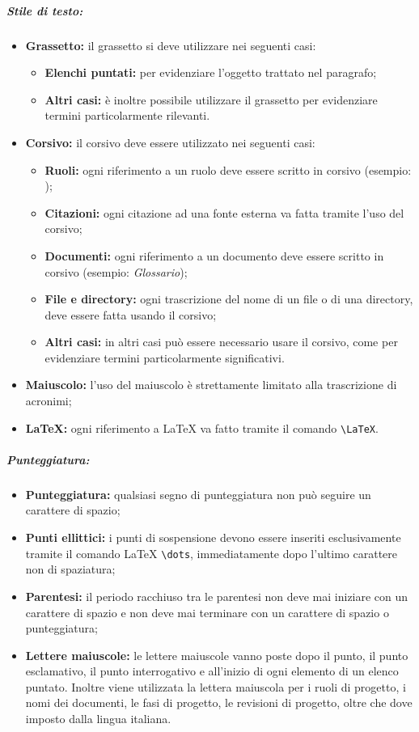 \subparagraph{Stile di testo:}
\label{stile}
\begin{itemize}
\item \textbf{Grassetto:} il grassetto si deve utilizzare nei seguenti casi:
\begin{itemize}
\item \textbf{Elenchi puntati:} per evidenziare l'oggetto trattato nel paragrafo;
\item \textbf{Altri casi:} è inoltre possibile utilizzare il grassetto per evidenziare termini particolarmente rilevanti. 
\end{itemize}
\item \textbf{Corsivo:} il corsivo deve essere utilizzato nei seguenti casi:
\begin{itemize}
\item \textbf{Ruoli:} ogni riferimento a un ruolo deve essere scritto in corsivo (esempio: \projectManager);
\item \textbf{Citazioni:} ogni citazione ad una fonte esterna va fatta tramite l'uso del corsivo;
\item \textbf{Documenti:} ogni riferimento a un documento deve essere scritto in corsivo (esempio: \emph{Glossario});
\item\textbf{File e directory:} ogni trascrizione del nome di un file o di una directory, deve essere fatta usando il corsivo; 
\item \textbf{Altri casi:} in altri casi può essere necessario usare il corsivo, come per evidenziare termini particolarmente significativi.
\end{itemize}
\item \textbf{Maiuscolo:} l'uso del maiuscolo è strettamente limitato alla trascrizione di acronimi;
\item \textbf{\LaTeX{}:} ogni riferimento a \LaTeX{} va fatto tramite il comando \verb!\LaTeX!.
\end{itemize}

\subparagraph{Punteggiatura:}
\label{punteggiatura}
\begin{itemize}
\item \textbf{Punteggiatura:} qualsiasi segno di punteggiatura non può seguire un carattere di spazio;
\item \textbf{Punti ellittici:} i punti di sospensione devono essere inseriti esclusivamente tramite il comando \LaTeX{} \verb!\dots!, immediatamente dopo l'ultimo carattere non di spaziatura;
\item \textbf{Parentesi:} il periodo racchiuso tra le parentesi non deve mai iniziare con un carattere di spazio e non deve mai terminare con un carattere di spazio o punteggiatura;
\item \textbf{Lettere maiuscole:} le lettere maiuscole vanno poste dopo il punto, il punto esclamativo, il punto interrogativo e all'inizio di ogni elemento di un elenco puntato. Inoltre viene utilizzata la lettera maiuscola per i ruoli di progetto, i nomi dei documenti, le fasi di progetto, le revisioni di progetto, oltre che dove imposto dalla lingua italiana.
\end{itemize}

